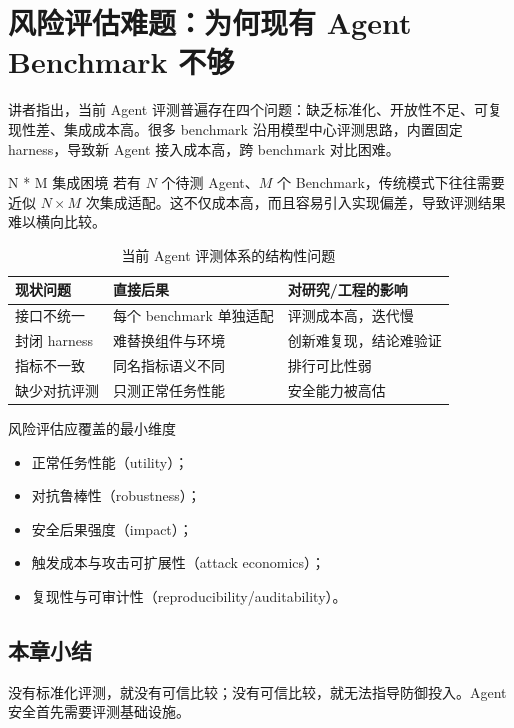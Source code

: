 \section{风险评估难题：为何现有 Agent Benchmark 不够}

讲者指出，当前 Agent 评测普遍存在四个问题：缺乏标准化、开放性不足、可复现性差、集成成本高。很多 benchmark 沿用模型中心评测思路，内置固定 harness，导致新 Agent 接入成本高，跨 benchmark 对比困难。

\begin{importantbox}{N * M 集成困境}
若有 $N$ 个待测 Agent、$M$ 个 Benchmark，传统模式下往往需要近似 $N \times M$ 次集成适配。这不仅成本高，而且容易引入实现偏差，导致评测结果难以横向比较。
\end{importantbox}

\begin{table}[H]
\centering
\begin{tabular}{p{2.6cm}p{3.8cm}p{4.6cm}}
\toprule
\textbf{现状问题} & \textbf{直接后果} & \textbf{对研究/工程的影响} \\
\midrule
接口不统一 & 每个 benchmark 单独适配 & 评测成本高，迭代慢 \\
封闭 harness & 难替换组件与环境 & 创新难复现，结论难验证 \\
指标不一致 & 同名指标语义不同 & 排行可比性弱 \\
缺少对抗评测 & 只测正常任务性能 & 安全能力被高估 \\
\bottomrule
\end{tabular}
\caption{当前 Agent 评测体系的结构性问题}
\end{table}

\begin{knowledgebox}{风险评估应覆盖的最小维度}
\begin{itemize}
    \item 正常任务性能（utility）；
    \item 对抗鲁棒性（robustness）；
    \item 安全后果强度（impact）；
    \item 触发成本与攻击可扩展性（attack economics）；
    \item 复现性与可审计性（reproducibility/auditability）。
\end{itemize}
\end{knowledgebox}

\subsection{本章小结}
没有标准化评测，就没有可信比较；没有可信比较，就无法指导防御投入。Agent 安全首先需要评测基础设施。

